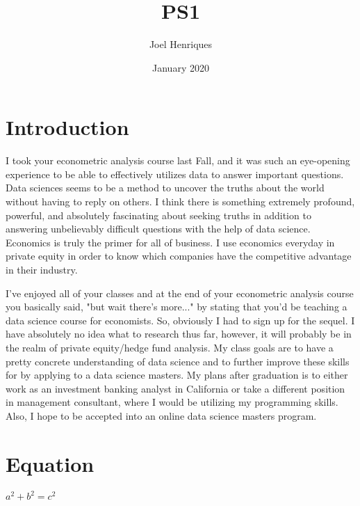 \documentclass{article}
\title{PS1}
\author{Joel Henriques}
\date{January 2020}
\begin{document}
\maketitle

\section{Introduction}
I took your econometric analysis course last Fall, and it was such an eye-opening experience to be able to effectively utilizes data to answer important questions. Data sciences seems to be a method to uncover the truths about the world without having to reply on others. I think there is something extremely profound, powerful, and absolutely fascinating about seeking truths in addition to answering unbelievably difficult questions with the help of data science. Economics is truly the primer for all of business. I use economics everyday in private equity in order to know which companies have the competitive advantage in their industry. 

I've enjoyed all of your classes and at the end of your econometric analysis course you basically said, "but wait there's more..." by stating that you'd be teaching a data science course for economists. So, obviously I had to sign up for the sequel. I have absolutely no idea what to research thus far, however, it will probably be in the realm of private equity/hedge fund analysis. My class goals are to have a pretty concrete understanding of data science and to further improve these skills for by applying to a data science masters. My plans after graduation is to either work as an investment banking analyst in California or take a different position in management consultant, where I would be utilizing my programming skills. Also, I hope to be accepted into an online data science masters program. 



\section{Equation}
$a^2+b^2=c^2$


\end{document}
